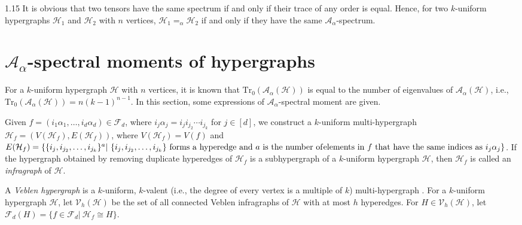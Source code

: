 \documentclass[preprint,12pt]{elsarticle1}
\newtheorem{remark}[thm]{Remark}
\numberwithin{equation}{section}
\begin{document}
\begin{spacing}{1.15}
It is obvious that two tensors have the same spectrum if and only if their trace of any order is equal.
Hence, for two $k$-uniform hypergraphs $\mathcal{H}_1$ and $\mathcal{H}_2$ with $n$ vertices, $\mathcal{H}_{1}=_{\alpha}\mathcal{H}_{2}$ if and only if they have the same $\mathcal{A}_{\alpha}$-spectrum.





\section{$\mathcal{A}_{\alpha}$-spectral moments of hypergraphs}
For a $k$-uniform hypergraph $\mathcal{H}$ with $n$ vertices, it is known that $\mathrm{Tr}_{0}(\mathcal{A}_{\alpha}(\mathcal{H}))$ is equal to the number of eigenvalues of $\mathcal{A}_{\alpha}(\mathcal{H})$, i.e., $\mathrm{Tr}_{0}(\mathcal{A}_{\alpha}(\mathcal{H}))=n(k-1)^{n-1}$.
In this section, some expressions of $\mathcal{A}_{\alpha}$-spectral moment are given.

Given $f=(i_{1}\alpha_{1},\ldots,i_{d}\alpha_{d})\in\mathcal{F}_{d}$, where $i_j\alpha_j=i_ji_{j_2}\cdots i_{j_k}$ for $j\in[d]$, we construct a $k$-uniform multi-hypergraph $\mathcal{H}_f=(V(\mathcal{H}_f),E(\mathcal{H}_f))$, where $V(\mathcal{H}_f)=V(f)$ and $E(\mathcal{H}_{f})=\{\{i_j,i_{j_2},\ldots,i_{j_k}\}^{a}|~ \{i_j,i_{j_2},\ldots,i_{j_k}\}~ \mathrm{forms}~ \mathrm{a}~ \mathrm{hyperedge}~ \mathrm{and}~ a\ \mathrm{is}~ \mathrm{the}~ \mathrm{number}~ \mathrm{of}\\ \mathrm{elements}~ \mathrm{in}~ f~ \mathrm{that}~ \mathrm{have}~ \mathrm{the}~ \mathrm{same}~ \mathrm{indices}~ \mathrm{as}~ i_j\alpha_j\}$.
If the hypergraph obtained by removing duplicate hyperedges of $\mathcal{H}_{f}$ is a subhypergraph of a $k$-uniform hypergraph $\mathcal{H}$, then $\mathcal{H}_{f}$ is called an \textit{infragraph} of $\mathcal{H}$.

A \textit{Veblen hypergraph} is a $k$-uniform, $k$-valent (i.e., the degree of every vertex is a multiple of $k$) multi-hypergraph \cite{ref10}.
For a $k$-uniform hypergraph $\mathcal{H}$, let $\mathcal{V}_{h}(\mathcal{H})$ be the set of all connected Veblen infragraphs of $\mathcal{H}$ with at most $h$ hyperedges.
For $H\in\mathcal{V}_{h}(\mathcal{H})$, let $\mathcal{F}_{d}(H)=\{f\in\mathcal{F}_d|\ \mathcal{H}_f\cong H\}$.


\end{spacing}
\end{document}
